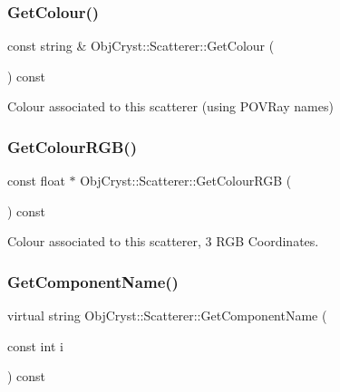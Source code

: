 \subsubsection{\texorpdfstring{GetColour()}{GetColour()}}
{\footnotesize\ttfamily const string \& Obj\+Cryst\+::\+Scatterer\+::\+Get\+Colour (\begin{DoxyParamCaption}{ }\end{DoxyParamCaption}) const\hspace{0.3cm}{\ttfamily [virtual]}}



Colour associated to this scatterer (using P\+O\+V\+Ray names) 

\mbox{\label{class_obj_cryst_1_1_scatterer_a4e7e5107e4557084f8cf7efb6489fee2}} 
\subsubsection{\texorpdfstring{GetColourRGB()}{GetColourRGB()}}
{\footnotesize\ttfamily const float $\ast$ Obj\+Cryst\+::\+Scatterer\+::\+Get\+Colour\+R\+GB (\begin{DoxyParamCaption}{ }\end{DoxyParamCaption}) const\hspace{0.3cm}{\ttfamily [virtual]}}



Colour associated to this scatterer, 3 R\+GB Coordinates. 

\mbox{\label{class_obj_cryst_1_1_scatterer_a42bdf508da6a90859a5a61e16c27d47e}} 
\subsubsection{\texorpdfstring{GetComponentName()}{GetComponentName()}}
{\footnotesize\ttfamily virtual string Obj\+Cryst\+::\+Scatterer\+::\+Get\+Component\+Name (\begin{DoxyParamCaption}\item[{const int}]{i }\end{DoxyParamCaption}) const\hspace{0.3cm}{\ttfamily [pure virtual]}}

